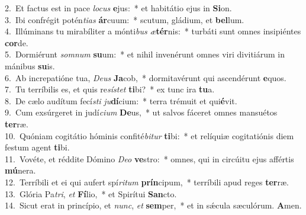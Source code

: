 {2.~}Et factus est in pace \textit{lo}\textit{cus} \textbf{e}jus:~* et habitátio ejus in \textbf{Si}on.\\
{3.~}Ibi confrégit potén\textit{ti}\textit{as} \textbf{ár}cuum:~* scutum, gládium, et \textbf{bel}lum.\\
{4.~}Illúminans tu mirabíliter a mónti\textit{bus} \textit{æ}\textbf{tér}nis:~* turbáti sunt omnes insipiéntes \textbf{cor}de.\\
{5.~}Dormiérunt \textit{som}\textit{num} \textbf{su}um:~* et nihil invenérunt omnes viri divitiárum in mánibus \textbf{su}is.\\
{6.~}Ab increpatióne tua, \textit{De}\textit{us} \textbf{Ja}cob,~* dormitavérunt qui ascendérunt \textbf{e}quos.\\
{7.~}Tu terríbilis es, et quis re\textit{sí}\textit{stet} \textbf{ti}bi?~* ex tunc ira \textbf{tu}a.\\
{8.~}De cælo audítum fecí\textit{sti} \textit{ju}\textbf{dí}cium:~* terra trémuit et qui\textbf{é}vit.\\
{9.~}Cum exsúrgeret in judí\textit{ci}\textit{um} \textbf{De}us,~* ut salvos fáceret omnes mansuétos \textbf{ter}ræ.\\
{10.~}Quóniam cogitátio hóminis confité\textit{bi}\textit{tur} \textbf{ti}bi:~* et relíquiæ cogitatiónis diem festum agent \textbf{ti}bi.\\
{11.~}Vovéte, et réddite Dómino \textit{De}\textit{o} \textbf{ve}stro:~* omnes, qui in circúitu ejus affértis \textbf{mú}nera.\\
{12.~}Terríbili et ei qui aufert spí\textit{ri}\textit{tum} \textbf{prín}cipum,~* terríbili apud reges \textbf{ter}ræ.\\
{13.~}Glória Pa\textit{tri}, \textit{et} \textbf{Fí}lio,~* et Spirítui \textbf{San}cto.\\
{14.~}Sicut erat in princípio, et \textit{nunc}, \textit{et} \textbf{sem}per,~* et in sǽcula sæculórum. \textbf{A}men.\\
